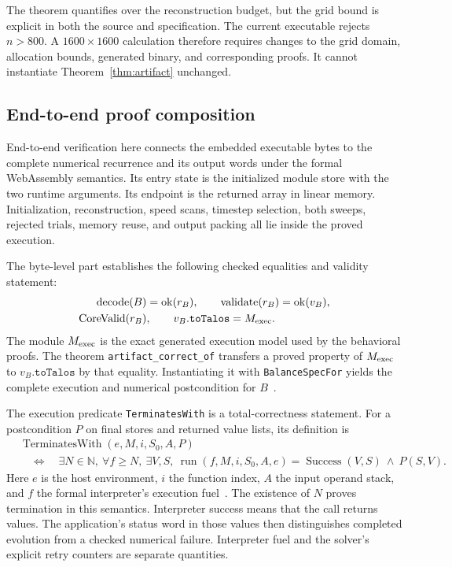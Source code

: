 \documentclass[11pt]{article}
\newcommand{\code}[1]{\texttt{#1}}
\newcommand{\NN}{\mathbb{N}}
\begin{document}
The theorem quantifies over the reconstruction budget, but the grid bound is explicit in both the source and specification.  The current executable rejects $n>800$.  A $1600\times1600$ calculation therefore requires changes to the grid domain, allocation bounds, generated binary, and corresponding proofs.  It cannot instantiate Theorem~\ref{thm:artifact} unchanged.

\subsection{End-to-end proof composition}
\label{sec:composition}

End-to-end verification here connects the embedded executable bytes to the complete numerical recurrence and its output words under the formal WebAssembly semantics.  Its entry state is the initialized module store with the two runtime arguments.  Its endpoint is the returned array in linear memory.  Initialization, reconstruction, speed scans, timestep selection, both sweeps, rejected trials, memory reuse, and output packing all lie inside the proved execution.

The byte-level part establishes the following checked equalities and validity statement:
\begin{equation}
\begin{split}
\operatorname{decode}(B)&=\operatorname{ok}(r_B),\qquad
\operatorname{validate}(r_B)=\operatorname{ok}(v_B),\\
\operatorname{CoreValid}(r_B)&,\qquad v_B.\code{toTalos}=M_{\rm exec}.
\end{split}
\end{equation}
The module $M_{\rm exec}$ is the exact generated execution model used by the behavioral proofs.  The theorem \code{artifact\_correct\_of} transfers a proved property of $M_{\rm exec}$ to $v_B.\code{toTalos}$ by that equality.  Instantiating it with \code{BalanceSpecFor} yields the complete execution and numerical postcondition for $B$~\cite{artifact,spec}.

The execution predicate \code{TerminatesWith} is a total-correctness statement.  For a postcondition $P$ on final stores and returned value lists, its definition is
\begin{equation}
\begin{split}
&\operatorname{TerminatesWith}(e,M,i,S_0,A,P)\\
&\quad\Longleftrightarrow\quad
\exists N\in\NN,\ \forall f\geq N,\ \exists V,S,\
\operatorname{run}(f,M,i,S_0,A,e)=\operatorname{Success}(V,S)\ \land\ P(S,V).
\end{split}
\end{equation}
Here $e$ is the host environment, $i$ the function index, $A$ the input operand stack, and $f$ the formal interpreter's execution fuel~\cite{talossemantics}.  The existence of $N$ proves termination in this semantics.  Interpreter success means that the call returns values.  The application's status word in those values then distinguishes completed evolution from a checked numerical failure.  Interpreter fuel and the solver's explicit retry counters are separate quantities.
\end{document}
